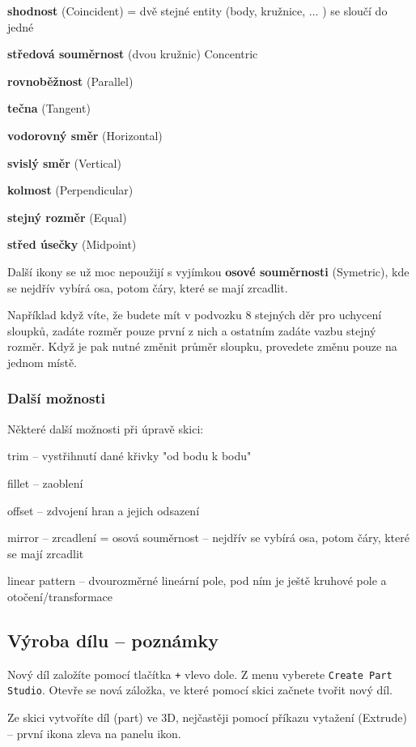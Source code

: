 \textbf{shodnost} (Coincident)  = dvě stejné entity (body, kružnice, ... ) se sloučí do jedné

\textbf{středová souměrnost} (dvou kružnic)  Concentric 

\textbf{rovnoběžnost} (Parallel)

\textbf{tečna} (Tangent)

\textbf{vodorovný směr} (Horizontal)
 
\textbf{svislý směr} (Vertical)

\textbf{kolmost} (Perpendicular) 

\textbf{stejný rozměr} (Equal)

\textbf{střed úsečky} (Midpoint)

Další ikony se už moc nepoužijí s vyjímkou \textbf{osové souměrnosti} (Symetric), kde se nejdřív vybírá osa, potom čáry, které se mají zrcadlit.

Například když víte, že budete mít v podvozku 8 stejných děr pro uchycení sloupků, zadáte rozměr pouze první z nich a ostatním zadáte vazbu stejný rozměr.
Když je pak nutné změnit průměr sloupku, provedete změnu pouze na jednom místě. 

\subsubsection{Další možnosti}

Některé další možnosti při úpravě skici: 

trim -- vystřihnutí dané křivky "od bodu k bodu"

fillet -- zaoblení 

offset -- zdvojení hran a jejich odsazení 

mirror -- zrcadlení = osová souměrnost -- nejdřív se vybírá osa, potom čáry, které se mají zrcadlit

linear pattern -- dvourozměrné lineární pole, 
pod ním je ještě kruhové pole a otočení/transformace 
 

\subsection{Výroba dílu  -- poznámky} \label{dil:vyroba} 

Nový díl založíte pomocí tlačítka \texttt{+} vlevo dole. 
Z menu vyberete {\tt Create Part Studio}. 
Otevře se nová záložka, ve které pomocí skici začnete tvořit nový díl.  

Ze skici vytvoříte díl (part) ve 3D, nejčastěji pomocí příkazu vytažení (Extrude) -- první ikona zleva na panelu ikon. 

